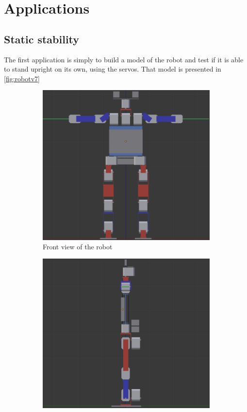 \section{Applications}
\subsection{Static stability}
The first application is simply to build a model of the robot and test if it is able to stand upright on its own, using the servos. That model is presented in \cref{fig:robotv7}

\begin{figure}[htp]
\center
\begin{subfigure}[b]{0.45\textwidth}
    \includegraphics[width = \textwidth]{figures/robot_v7_front}
    \caption[]{Front view of the robot}
    \label{fig:robotv7_front}
\end{subfigure}
\hfill
\begin{subfigure}[b]{0.45\textwidth}
\center
    \includegraphics[width = \textwidth]{figures/robot_v7_side}

\end{subfigure}
\end{figure}
